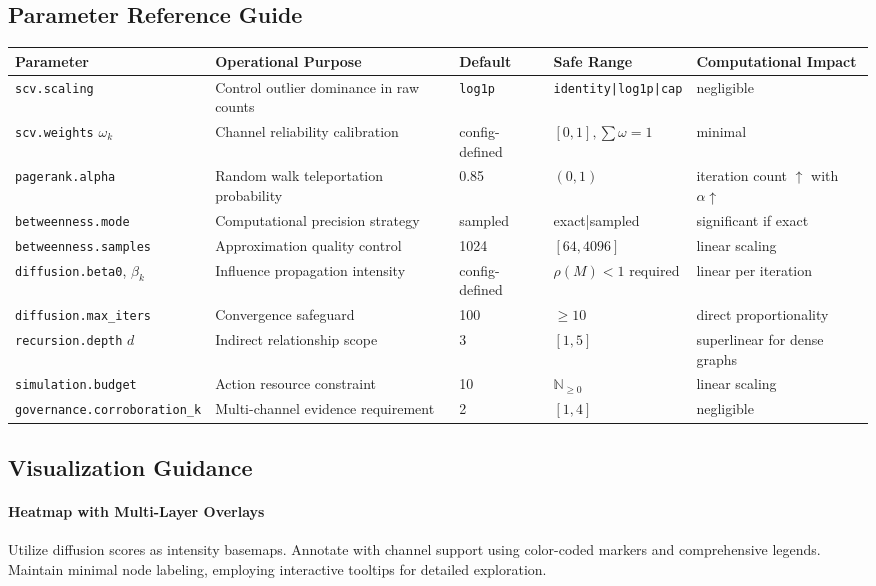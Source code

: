 \documentclass[12pt]{article}
\theoremstyle{plain}
\begin{document}
\subsection{Parameter Reference Guide}
\begin{center}
\small
\begin{tabular}{p{3.3cm} p{5.7cm} p{2.1cm} p{2.2cm} p{2.2cm}}
\toprule
\textbf{Parameter} & \textbf{Operational Purpose} & \textbf{Default} & \textbf{Safe Range} & \textbf{Computational Impact}\\
\midrule
\texttt{scv.scaling} & Control outlier dominance in raw counts & \texttt{log1p} & \texttt{identity|log1p|cap} & negligible\\
\texttt{scv.weights} $\omega_k$ & Channel reliability calibration & config-defined & $[0,1],\sum\omega=1$ & minimal\\
\texttt{pagerank.alpha} & Random walk teleportation probability & 0.85 & $(0,1)$ & iteration count $\uparrow$ with $\alpha\uparrow$\\
\texttt{betweenness.mode} & Computational precision strategy & sampled & exact|sampled & significant if exact\\
\texttt{betweenness.samples} & Approximation quality control & 1024 & $[64,4096]$ & linear scaling\\
\texttt{diffusion.beta0}, $\beta_k$ & Influence propagation intensity & config-defined & $\rho(M)<1$ required & linear per iteration\\
\texttt{diffusion.max\_iters} & Convergence safeguard & 100 & $\ge 10$ & direct proportionality\\
\texttt{recursion.depth} $d$ & Indirect relationship scope & 3 & $[1,5]$ & superlinear for dense graphs\\
\texttt{simulation.budget} & Action resource constraint & 10 & $\mathbb{N}_{\ge 0}$ & linear scaling\\
\texttt{governance.corroboration\_k} & Multi-channel evidence requirement & 2 & $[1,4]$ & negligible\\
\bottomrule
\end{tabular}
\end{center}

\subsection{Visualization Guidance}
\paragraph{Heatmap with Multi-Layer Overlays} 
Utilize diffusion scores as intensity basemaps. Annotate with channel support using color-coded markers and comprehensive legends. Maintain minimal node labeling, employing interactive tooltips for detailed exploration.
\end{document}
